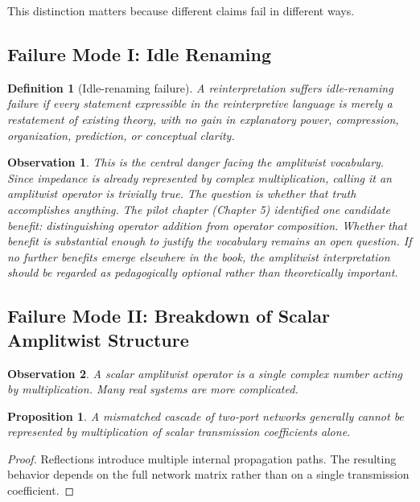 \documentclass[12pt]{article}
\newtheorem{definition}{Definition}
\newtheorem{proposition}{Proposition}
\newtheorem{observation}{Observation}
\begin{document}
This distinction matters because different claims fail in different ways.

\subsection{Failure Mode I: Idle Renaming}

\begin{definition}[Idle-renaming failure]
A reinterpretation suffers idle-renaming failure if every statement expressible in the reinterpretive language is merely a restatement of existing theory, with no gain in explanatory power, compression, organization, prediction, or conceptual clarity.
\end{definition}

\begin{observation}
This is the central danger facing the amplitwist vocabulary. Since impedance is already represented by complex multiplication, calling it an amplitwist operator is trivially true. The question is whether that truth accomplishes anything. The pilot chapter (Chapter 5) identified one candidate benefit: distinguishing operator addition from operator composition. Whether that benefit is substantial enough to justify the vocabulary remains an open question. If no further benefits emerge elsewhere in the book, the amplitwist interpretation should be regarded as pedagogically optional rather than theoretically important.
\end{observation}

\subsection{Failure Mode II: Breakdown of Scalar Amplitwist Structure}

\begin{observation}
A scalar amplitwist operator is a single complex number acting by multiplication. Many real systems are more complicated.
\end{observation}

\begin{proposition}
A mismatched cascade of two-port networks generally cannot be represented by multiplication of scalar transmission coefficients alone.
\end{proposition}

\begin{proof}
Reflections introduce multiple internal propagation paths. The resulting behavior depends on the full network matrix rather than on a single transmission coefficient.
\end{proof}
\end{document}
